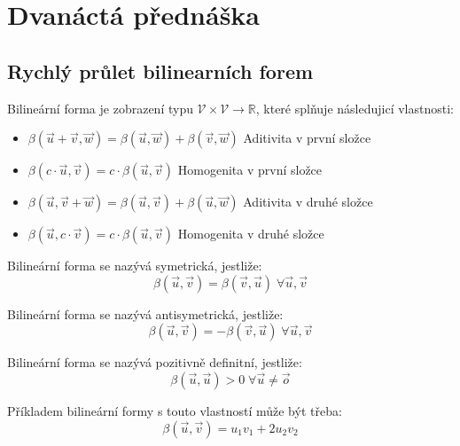 \section{Dvanáctá přednáška}
\subsection{Rychlý průlet bilinearních forem}
\begin{definition}
    Bilineární forma je zobrazení typu $\mathcal{V} \times \mathcal{V} \rightarrow \mathbb{R}$,
    které splňuje následujicí vlastnosti:
    \begin{itemize}
        \item $\beta(\vec{u} + \vec{v}, \vec{w}) = \beta(\vec{u}, \vec{w}) + \beta(\vec{v}, \vec{w})$ \hfill Aditivita v první složce
        \item $\beta(c\cdot \vec{u}, \vec{v}) = c \cdot \beta(\vec{u}, \vec{v})$ \hfill Homogenita v první složce
        \item $\beta(\vec{u}, \vec{v} + \vec{w}) = \beta(\vec{u}, \vec{v}) + \beta(\vec{u}, \vec{w})$ \hfill Aditivita v druhé složce
        \item $\beta(\vec{u}, c\cdot \vec{v}) = c \cdot \beta(\vec{u}, \vec{v})$ \hfill Homogenita v druhé složce
    \end{itemize}
\end{definition}

\begin{definition}
    Bilineární forma se nazývá symetrická, jestliže:
    $$\beta(\vec{u}, \vec{v}) = \beta(\vec{v}, \vec{u})\; \forall \vec{u}, \vec{v}$$
\end{definition}


\begin{definition}
    Bilineární forma se nazývá antisymetrická, jestliže:
    $$\beta(\vec{u}, \vec{v}) = -\beta(\vec{v}, \vec{u})\; \forall \vec{u}, \vec{v}$$
\end{definition}

\begin{definition}
    Bilineární forma se nazývá pozitivně definitní, jestliže:
    $$\beta(\vec{u}, \vec{u}) > 0 \; \forall \vec{u} \neq \vec{o}$$

    Příkladem bilineární formy s touto vlastností může být třeba:
    $$\beta(\vec{u}, \vec{v}) = u_1 v_1 + 2 u_2 v_2$$
\end{definition}

